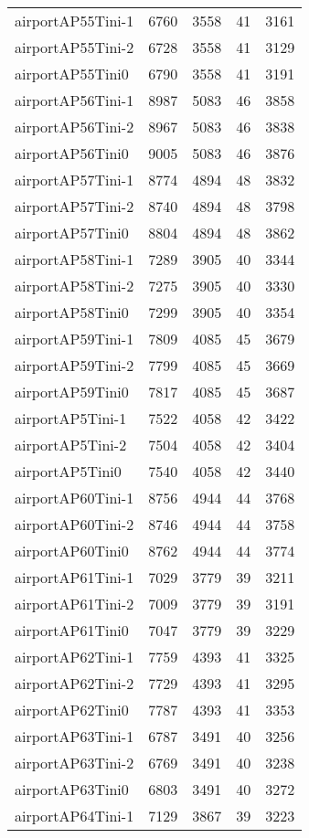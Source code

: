 \begin{longtable}{lrrrr}
airportAP55Tini-1 & 6760 & 3558 & 41 & 3161 \\
airportAP55Tini-2 & 6728 & 3558 & 41 & 3129 \\
airportAP55Tini0 & 6790 & 3558 & 41 & 3191 \\
airportAP56Tini-1 & 8987 & 5083 & 46 & 3858 \\
airportAP56Tini-2 & 8967 & 5083 & 46 & 3838 \\
airportAP56Tini0 & 9005 & 5083 & 46 & 3876 \\
airportAP57Tini-1 & 8774 & 4894 & 48 & 3832 \\
airportAP57Tini-2 & 8740 & 4894 & 48 & 3798 \\
airportAP57Tini0 & 8804 & 4894 & 48 & 3862 \\
airportAP58Tini-1 & 7289 & 3905 & 40 & 3344 \\
airportAP58Tini-2 & 7275 & 3905 & 40 & 3330 \\
airportAP58Tini0 & 7299 & 3905 & 40 & 3354 \\
airportAP59Tini-1 & 7809 & 4085 & 45 & 3679 \\
airportAP59Tini-2 & 7799 & 4085 & 45 & 3669 \\
airportAP59Tini0 & 7817 & 4085 & 45 & 3687 \\
airportAP5Tini-1 & 7522 & 4058 & 42 & 3422 \\
airportAP5Tini-2 & 7504 & 4058 & 42 & 3404 \\
airportAP5Tini0 & 7540 & 4058 & 42 & 3440 \\
airportAP60Tini-1 & 8756 & 4944 & 44 & 3768 \\
airportAP60Tini-2 & 8746 & 4944 & 44 & 3758 \\
airportAP60Tini0 & 8762 & 4944 & 44 & 3774 \\
airportAP61Tini-1 & 7029 & 3779 & 39 & 3211 \\
airportAP61Tini-2 & 7009 & 3779 & 39 & 3191 \\
airportAP61Tini0 & 7047 & 3779 & 39 & 3229 \\
airportAP62Tini-1 & 7759 & 4393 & 41 & 3325 \\
airportAP62Tini-2 & 7729 & 4393 & 41 & 3295 \\
airportAP62Tini0 & 7787 & 4393 & 41 & 3353 \\
airportAP63Tini-1 & 6787 & 3491 & 40 & 3256 \\
airportAP63Tini-2 & 6769 & 3491 & 40 & 3238 \\
airportAP63Tini0 & 6803 & 3491 & 40 & 3272 \\
airportAP64Tini-1 & 7129 & 3867 & 39 & 3223 \\

\end{longtable}
